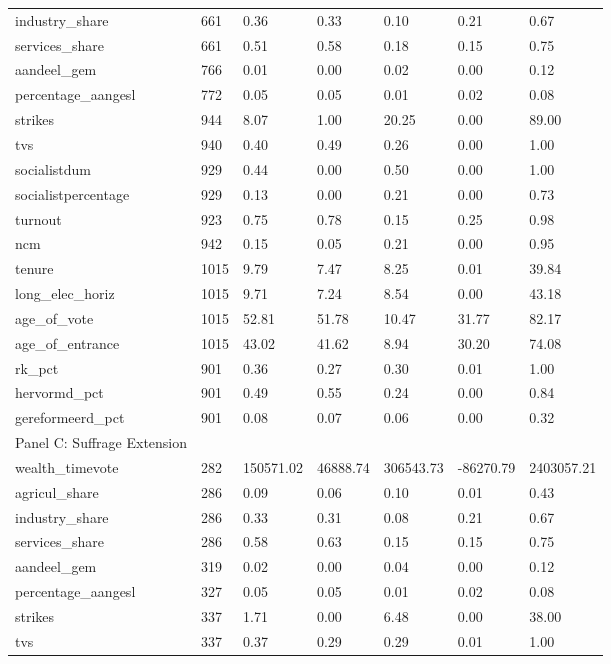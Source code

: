 \begin{longtable}{lllllll}
industry\_share & 661 & 0.36 & 0.33 & 0.10 & 0.21 & 0.67 \\ 
services\_share & 661 & 0.51 & 0.58 & 0.18 & 0.15 & 0.75 \\ 
aandeel\_gem & 766 & 0.01 & 0.00 & 0.02 & 0.00 & 0.12 \\ 
percentage\_aangesl & 772 & 0.05 & 0.05 & 0.01 & 0.02 & 0.08 \\ 
strikes & 944 & 8.07 & 1.00 & 20.25 & 0.00 & 89.00 \\ 
tvs & 940 & 0.40 & 0.49 & 0.26 & 0.00 & 1.00 \\ 
socialistdum & 929 & 0.44 & 0.00 & 0.50 & 0.00 & 1.00 \\ 
socialistpercentage & 929 & 0.13 & 0.00 & 0.21 & 0.00 & 0.73 \\ 
turnout & 923 & 0.75 & 0.78 & 0.15 & 0.25 & 0.98 \\ 
ncm & 942 & 0.15 & 0.05 & 0.21 & 0.00 & 0.95 \\ 
tenure & 1015 & 9.79 & 7.47 & 8.25 & 0.01 & 39.84 \\ 
long\_elec\_horiz & 1015 & 9.71 & 7.24 & 8.54 & 0.00 & 43.18 \\ 
age\_of\_vote & 1015 & 52.81 & 51.78 & 10.47 & 31.77 & 82.17 \\ 
age\_of\_entrance & 1015 & 43.02 & 41.62 & 8.94 & 30.20 & 74.08 \\ 
rk\_pct & 901 & 0.36 & 0.27 & 0.30 & 0.01 & 1.00 \\ 
hervormd\_pct & 901 & 0.49 & 0.55 & 0.24 & 0.00 & 0.84 \\ 
gereformeerd\_pct & 901 & 0.08 & 0.07 & 0.06 & 0.00 & 0.32 \\ 
\midrule
\multicolumn{1}{l}{Panel C: Suffrage Extension} \\ 
\midrule
wealth\_timevote & 282 & 150571.02 & 46888.74 & 306543.73 & -86270.79 & 2403057.21 \\ 
agricul\_share & 286 & 0.09 & 0.06 & 0.10 & 0.01 & 0.43 \\ 
industry\_share & 286 & 0.33 & 0.31 & 0.08 & 0.21 & 0.67 \\ 
services\_share & 286 & 0.58 & 0.63 & 0.15 & 0.15 & 0.75 \\ 
aandeel\_gem & 319 & 0.02 & 0.00 & 0.04 & 0.00 & 0.12 \\ 
percentage\_aangesl & 327 & 0.05 & 0.05 & 0.01 & 0.02 & 0.08 \\ 
strikes & 337 & 1.71 & 0.00 & 6.48 & 0.00 & 38.00 \\ 
tvs & 337 & 0.37 & 0.29 & 0.29 & 0.01 & 1.00 \\ 

\end{longtable}
